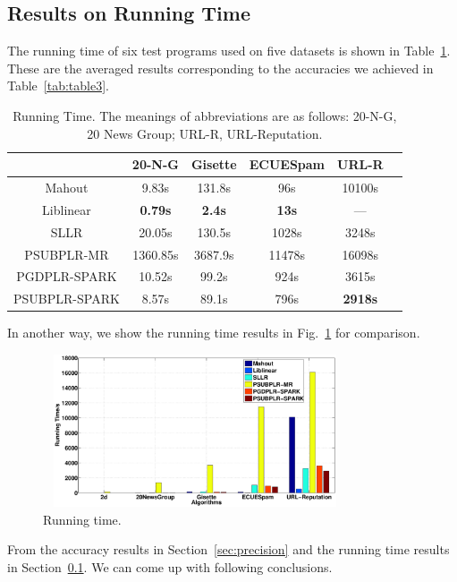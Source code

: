 \documentclass[10pt, conference, compsocconf]{IEEEtran}
\begin{document}
\subsection{Results on Running Time} \label{sec:time}

The running time of six test programs used on five datasets is shown in Table~\ref{tab:table4}.
These are the averaged results corresponding to the accuracies we achieved in Table~\ref{tab:table3}.
%
\begin{table}[h]
\centering
\caption{Running Time. The meanings of abbreviations are as follows: 20-N-G, 20 News Group; URL-R, URL-Reputation.}\label{tab:table4}\vspace{-0.3cm}
\begin{tabular}{|c|c|c|c|c|c|}
\hline
           & 20-N-G & Gisette & ECUESpam & URL-R \\
\hline
Mahout     & 9.83s & 131.8s & 96s & 10100s \\
\hline
Liblinear  & \textbf{0.79s} & \textbf{2.4s} & \textbf{13s} & --- \\
\hline
SLLR       & 20.05s & 130.5s & 1028s & 3248s \\
\hline
PSUBPLR-MR & 1360.85s & 3687.9s & 11478s & 16098s \\
\hline
PGDPLR-SPARK & 10.52s & 99.2s & 924s & 3615s \\
\hline
PSUBPLR-SPARK & 8.57s & 89.1s & 796s & \textbf{2918s} \\
\hline
\end{tabular}
\end{table}

In another way, we show the running time results in Fig.~\ref{fig:08} for comparison.
\begin{figure}[tb]
\center \includegraphics[height=4.5cm,width=9cm]{img/all_time.eps}\vspace{-0.3cm}
\caption{Running time.}\label{fig:08}\vspace{-0.5cm}
\end{figure}

From the accuracy results in Section~\ref{sec:precision} and the running time results in Section~\ref{sec:time}.
We can come up with following conclusions.
\end{document}
